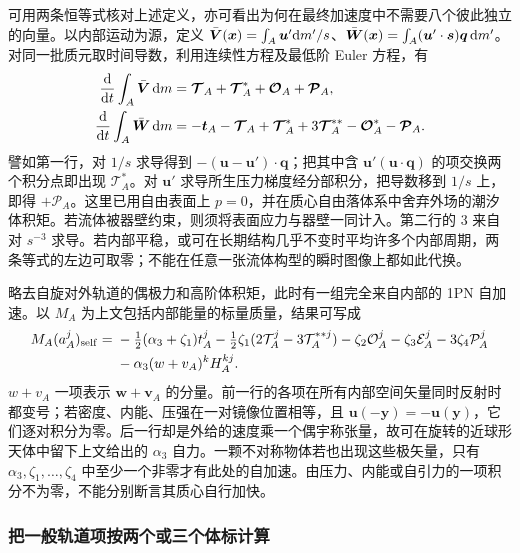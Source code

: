 可用两条恒等式核对上述定义，亦可看出为何在最终加速度中不需要八个彼此独立的向量。以内部运动为源，定义 $\bar{\bm V}(\bm x)=\int_A \bm u'\dd m'/s$、$\bar{\bm W}(\bm x)=\int_A (\bm u'\cdot\bm s)\bm q\,\dd m'$。对同一批质元取时间导数，利用连续性方程及最低阶 Euler 方程，有
\begin{align*}
 \frac{\dd}{\dd t}\int_A\bar{\bm V}\,\dd m
      &=\bm{\mathcal T}_A+\bm{\mathcal T}_A^*+
                         \bm{\mathcal O}_A+\bm{\mathcal P}_A,\\
 \frac{\dd}{\dd t}\int_A\bar{\bm W}\,\dd m
      &=-\bm t_A-\bm{\mathcal T}_A+\bm{\mathcal T}_A^*
                 +3\bm{\mathcal T}_A^{**}
                 -\bm{\mathcal O}_A^*-\bm{\mathcal P}_A .
\end{align*}
譬如第一行，对 $1/s$ 求导得到 $-(\bm u-\bm u')\cdot\bm q$；把其中含 $\bm u' (\bm u\cdot\bm q)$ 的项交换两个积分点即出现 $\bm{\mathcal T}_A^*$。对 $\bm u'$ 求导所生压力梯度经分部积分，把导数移到 $1/s$ 上，即得 $+\bm{\mathcal P}_A$。这里已用自由表面上 $p=0$，并在质心自由落体系中舍弃外场的潮汐体积矩。若流体被器壁约束，则须将表面应力与器壁一同计入。第二行的 3 来自对 $s^{-3}$ 求导。若内部平稳，或可在长期结构几乎不变时平均许多个内部周期，两条等式的左边可取零；不能在任意一张流体构型的瞬时图像上都如此代换。

略去自旋对外轨道的偶极力和高阶体积矩，此时有一组完全来自内部的 1PN 自加速。以 $M_A$ 为上文包括内部能量的标量质量，结果可写成
\begin{align*}
 M_A(a_A^j)_{\rm self}={}&
    -\tfrac12(\alpha_3+\zeta_1)t_A^j
    -\tfrac12\zeta_1(2\mathcal T_A^j-3\mathcal T_A^{**j})
    -\zeta_2\mathcal O_A^j-\zeta_3\mathcal E_A^j-3\zeta_4\mathcal P_A^j\\
    &-\alpha_3(w+v_A)^k H_A^{kj}.
\end{align*}
$w+v_A$ 一项表示 $\bm w+\bm v_A$ 的分量。前一行的各项在所有内部空间矢量同时反射时都变号；若密度、内能、压强在一对镜像位置相等，且 $\bm u(-\bm y)=-\bm u(\bm y)$，它们逐对积分为零。后一行却是外给的速度乘一个偶宇称张量，故可在旋转的近球形天体中留下上文给出的 $\alpha_3$ 自力。一颗不对称物体若也出现这些极矢量，只有 $\alpha_3,\zeta_1,\ldots,\zeta_4$ 中至少一个非零才有此处的自加速。由压力、内能或自引力的一项积分不为零，不能分别断言其质心自行加快。

\subsubsection{把一般轨道项按两个或三个体标计算}

